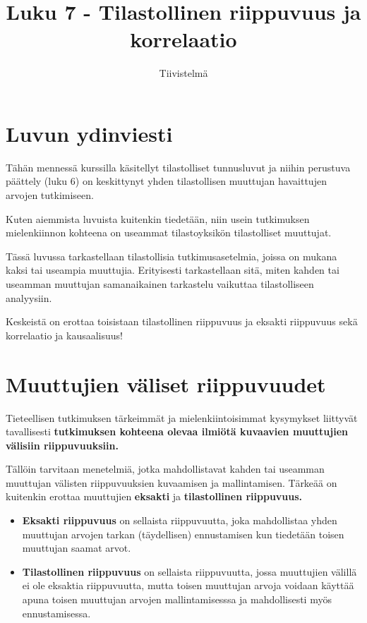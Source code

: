 \documentclass[
]{report}
\title{Luku 7 - Tilastollinen riippuvuus ja korrelaatio}
\subtitle{Tiivistelmä}
\author{}
\date{}
\begin{document}
\maketitle
\ifdefined\Shaded\renewenvironment{Shaded}{\begin{tcolorbox}[boxrule=0pt, sharp corners, frame hidden, enhanced, interior hidden, breakable, borderline west={3pt}{0pt}{shadecolor}]}{\end{tcolorbox}}\fi

\hypertarget{luvun-ydinviesti}{%
\section{Luvun ydinviesti}\label{luvun-ydinviesti}}

Tähän mennessä kurssilla käsitellyt tilastolliset tunnusluvut ja niihin
perustuva päättely (luku 6) on keskittynyt yhden tilastollisen muuttujan
havaittujen arvojen tutkimiseen.

Kuten aiemmista luvuista kuitenkin tiedetään, niin usein tutkimuksen
mielenkiinnon kohteena on useammat tilastoyksikön tilastolliset
muuttujat.

Tässä luvussa tarkastellaan tilastollisia tutkimusasetelmia, joissa on
mukana kaksi tai useampia muuttujia. Erityisesti tarkastellaan sitä,
miten kahden tai useamman muuttujan samanaikainen tarkastelu vaikuttaa
tilastolliseen analyysiin.

Keskeistä on erottaa toisistaan tilastollinen riippuvuus ja eksakti
riippuvuus sekä korrelaatio ja kausaalisuus!

\hypertarget{muuttujien-vuxe4liset-riippuvuudet}{%
\section{Muuttujien väliset
riippuvuudet}\label{muuttujien-vuxe4liset-riippuvuudet}}

Tieteellisen tutkimuksen tärkeimmät ja mielenkiintoisimmat kysymykset
liittyvät tavallisesti \textbf{tutkimuksen kohteena olevaa ilmiötä
kuvaavien muuttujien välisiin riippuvuuksiin.}

Tällöin tarvitaan menetelmiä, jotka mahdollistavat kahden tai useamman
muuttujan välisten riippuvuuksien kuvaamisen ja mallintamisen. Tärkeää
on kuitenkin erottaa muuttujien \textbf{eksakti} ja
\textbf{tilastollinen riippuvuus.}

\begin{itemize}
\item
  \textbf{Eksakti riippuvuus} on sellaista riippuvuutta, joka
  mahdollistaa yhden muuttujan arvojen tarkan (täydellisen) ennustamisen
  kun tiedetään toisen muuttujan saamat arvot.
\item
  \textbf{Tilastollinen riippuvuus} on sellaista riippuvuutta, jossa
  muuttujien välillä ei ole eksaktia riippuvuutta, mutta toisen
  muuttujan arvoja voidaan käyttää apuna toisen muuttujan arvojen
  mallintamisesssa ja mahdollisesti myös ennustamisessa.
\end{itemize}
\end{document}
